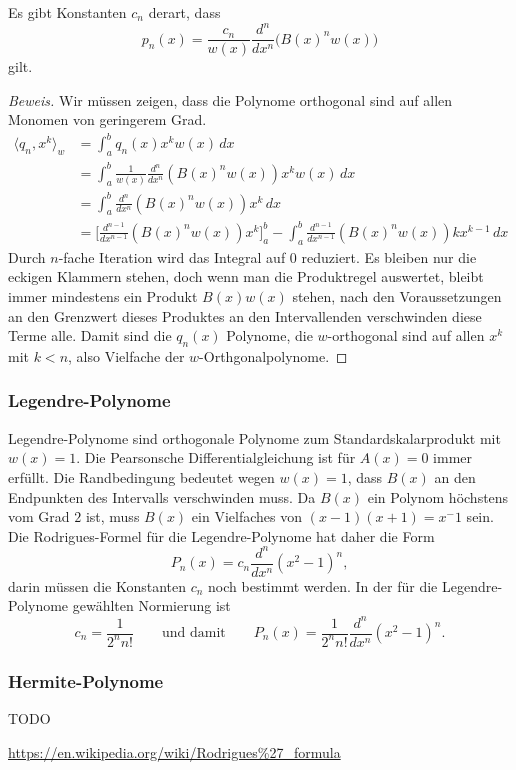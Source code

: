 \begin{satz}
Es gibt Konstanten $c_n$ derart, dass
\[
p_n(x)
=
\frac{c_n}{w(x)} \frac{d^n}{dx^n} \bigl(B(x)^n w(x)\bigr) 
\]
gilt.
\end{satz}

\begin{proof}[Beweis]
Wir müssen zeigen, dass die Polynome orthogonal sind auf allen Monomen
von geringerem Grad.
\begin{align*}
\langle q_n, x^k\rangle_w
&=
\int_a^b q_n(x)x^kw(x)\,dx
\\
&=
\int_a^b \frac{1}{w(x)}\frac{d^n}{dx^n}(B(x)^n w(x)) x^k w(x)\,dx
\\
&=
\int_a^b \frac{d^n}{dx^n}(B(x)^n w(x)) x^k \,dx
\\
&=
\biggl[\frac{d^{n-1}}{dx^{n-1}}(B(x)^n w(x)) x^k \biggr]_a^b
-
\int_a^b \frac{d^{n-1}}{dx^{n-1}}(B(x)^n w(x))kx^{k-1}\,dx
\end{align*}
Durch $n$-fache Iteration wird das Integral auf $0$ reduziert.
Es bleiben nur die eckigen Klammern stehen, doch wenn man die Produktregel
auswertet, bleibt immer mindestens ein Produkt $B(x)w(x)$ stehen,
nach den Voraussetzungen an den Grenzwert dieses Produktes an den
Intervallenden verschwinden diese Terme alle.
Damit sind die $q_n(x)$ Polynome, die $w$-orthogonal sind auf allen
$x^k$ mit $k<n$, also Vielfache der $w$-Orthgonalpolynome.
\end{proof}

\subsubsection{Legendre-Polynome}
Legendre-Polynome sind orthogonale Polynome zum Standardskalarprodukt
mit $w(x)=1$.
Die Pearsonsche Differentialgleichung ist für $A(x)=0$ immer erfüllt.
Die Randbedingung bedeutet wegen $w(x)=1$, dass $B(x)$ an den
Endpunkten des Intervalls verschwinden muss.
Da $B(x)$ ein Polynom höchstens vom Grad $2$ ist, muss $B(x)$ ein
Vielfaches von $(x-1)(x+1)=x^-1$ sein.
Die Rodrigues-Formel für die Legendre-Polynome hat daher die Form
\[
P_n(x)
=
c_n
\frac{d^n}{dx^n}
(x^2-1)^n,
\]
darin müssen die Konstanten $c_n$ noch bestimmt werden.
In der für die Legendre-Polynome gewählten Normierung ist
\[
c_n = \frac1{2^n n!}
\qquad\text{und damit}\qquad
P_n(x)
=
\frac{1}{2^nn!}
\frac{d^n}{dx^n}
(x^2-1)^n.
\]

\subsubsection{Hermite-Polynome}
TODO

\url{https://en.wikipedia.org/wiki/Rodrigues%27_formula}


